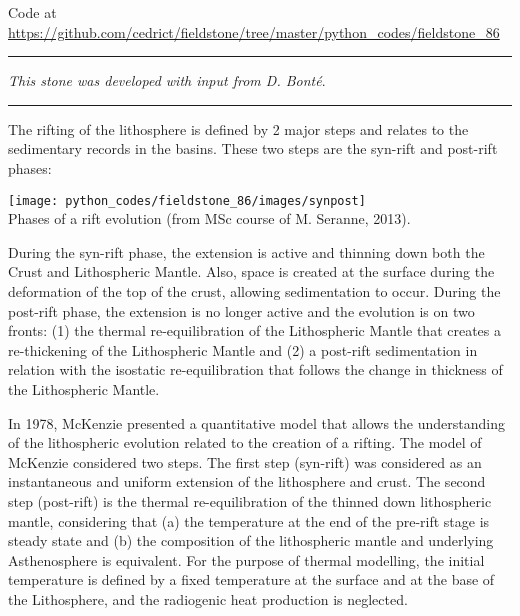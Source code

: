 \begin{center}
Code at \url{https://github.com/cedrict/fieldstone/tree/master/python_codes/fieldstone_86}
\end{center}

\par\noindent\rule{\textwidth}{0.4pt}

{\sl This stone was developed with input from D. Bont{\'e}}. 

\par\noindent\rule{\textwidth}{0.4pt}

The rifting of the lithosphere is defined by 2 major steps and relates to 
the sedimentary records in the basins. These two steps are the syn-rift 
and post-rift phases:

\begin{center}
\texttt{[image: python\_codes/fieldstone\_86/images/synpost]}\\
{\captionfont Phases of a rift evolution (from MSc course of M. Seranne, 2013).} 
\end{center}

During the syn-rift phase, the extension is active and thinning down both the 
Crust and Lithospheric Mantle. Also, space is created at the surface during the deformation 
of the top of the crust, allowing sedimentation to occur. During the post-rift phase, 
the extension is no longer active and the evolution is on two fronts: 
(1) the thermal re-equilibration of the Lithospheric Mantle that creates a re-thickening 
of the Lithospheric Mantle and 
(2) a post-rift sedimentation in relation with the isostatic re-equilibration that 
follows the change in thickness of the Lithospheric Mantle.

In 1978, McKenzie presented a quantitative model \cite{mcke78} 
that allows the understanding of the lithospheric evolution related to the creation of a rifting. 
The model of McKenzie considered two steps. The first step (syn-rift) was considered as an 
instantaneous and uniform extension of the lithosphere and crust. The second step (post-rift) 
is the thermal re-equilibration of the thinned down lithospheric mantle, considering that 
(a) the temperature at the end of the pre-rift stage is steady state and (b) the composition 
of the lithospheric mantle and underlying Asthenosphere is equivalent. For the purpose of 
thermal modelling, the initial temperature is defined by a fixed temperature at the surface 
and at the base of the Lithosphere, and the radiogenic heat production is neglected.


